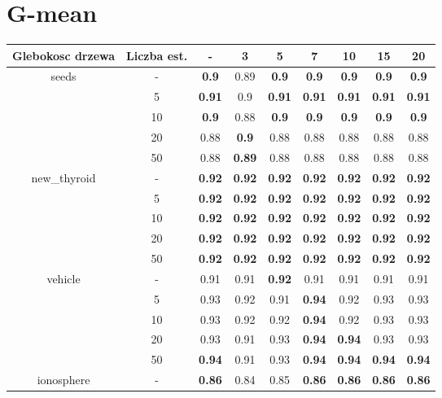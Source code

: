 \documentclass{article}%
\begin{document}
\section*{G{-}mean}%
\begin{tabular}{c|c|ccccccc}%
\hline%
Glebokosc drzewa&Liczba est.&{-}&3&5&7&10&15&20\\%
\hline%
\multirow{5}{*}{seeds}&{-}&\textbf{0.9}&0.89&\textbf{0.9}&\textbf{0.9}&\textbf{0.9}&\textbf{0.9}&\textbf{0.9}\\%
\cline{2%
-%
9}%
&5&\textbf{0.91}&0.9&\textbf{0.91}&\textbf{0.91}&\textbf{0.91}&\textbf{0.91}&\textbf{0.91}\\%
\cline{2%
-%
9}%
&10&\textbf{0.9}&0.88&\textbf{0.9}&\textbf{0.9}&\textbf{0.9}&\textbf{0.9}&\textbf{0.9}\\%
\cline{2%
-%
9}%
&20&0.88&\textbf{0.9}&0.88&0.88&0.88&0.88&0.88\\%
\cline{2%
-%
9}%
&50&0.88&\textbf{0.89}&0.88&0.88&0.88&0.88&0.88\\%
\hline%
\multirow{5}{*}{new\_thyroid}&{-}&\textbf{0.92}&\textbf{0.92}&\textbf{0.92}&\textbf{0.92}&\textbf{0.92}&\textbf{0.92}&\textbf{0.92}\\%
\cline{2%
-%
9}%
&5&\textbf{0.92}&\textbf{0.92}&\textbf{0.92}&\textbf{0.92}&\textbf{0.92}&\textbf{0.92}&\textbf{0.92}\\%
\cline{2%
-%
9}%
&10&\textbf{0.92}&\textbf{0.92}&\textbf{0.92}&\textbf{0.92}&\textbf{0.92}&\textbf{0.92}&\textbf{0.92}\\%
\cline{2%
-%
9}%
&20&\textbf{0.92}&\textbf{0.92}&\textbf{0.92}&\textbf{0.92}&\textbf{0.92}&\textbf{0.92}&\textbf{0.92}\\%
\cline{2%
-%
9}%
&50&\textbf{0.92}&\textbf{0.92}&\textbf{0.92}&\textbf{0.92}&\textbf{0.92}&\textbf{0.92}&\textbf{0.92}\\%
\hline%
\multirow{5}{*}{vehicle}&{-}&0.91&0.91&\textbf{0.92}&0.91&0.91&0.91&0.91\\%
\cline{2%
-%
9}%
&5&0.93&0.92&0.91&\textbf{0.94}&0.92&0.93&0.93\\%
\cline{2%
-%
9}%
&10&0.93&0.92&0.92&\textbf{0.94}&0.92&0.93&0.93\\%
\cline{2%
-%
9}%
&20&0.93&0.91&0.93&\textbf{0.94}&\textbf{0.94}&0.93&0.93\\%
\cline{2%
-%
9}%
&50&\textbf{0.94}&0.91&0.93&\textbf{0.94}&\textbf{0.94}&\textbf{0.94}&\textbf{0.94}\\%
\hline%
\multirow{5}{*}{ionosphere}&{-}&\textbf{0.86}&0.84&0.85&\textbf{0.86}&\textbf{0.86}&\textbf{0.86}&\textbf{0.86}\\%

\end{tabular}
\end{document}
